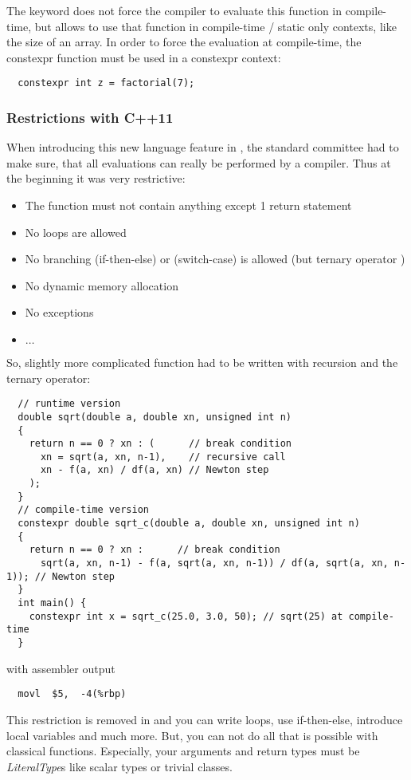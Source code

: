 The keyword  does not force the compiler to evaluate this function in compile-time, but allows to use that function in
compile-time / static only contexts, like the size of an array. In order to force the evaluation at compile-time, the constexpr function
must be used in a constexpr context:
\begin{verbatim}
  constexpr int z = factorial(7);
\end{verbatim}

\subsubsection{Restrictions with C++11}
When introducing this new language feature in , the standard committee had to make sure, that all evaluations can really be performed
by a compiler. Thus at the beginning it was very restrictive:
\begin{itemize}
  \item The function must not contain anything except 1 return statement
  \item No loops are allowed
  \item No branching (if-then-else) or (switch-case) is allowed (but ternary operator )
  \item No dynamic memory allocation
  \item No exceptions
  \item $\ldots$
\end{itemize}

So, slightly more complicated function had to be written with recursion and the ternary operator:
%
\begin{verbatim}
  // runtime version
  double sqrt(double a, double xn, unsigned int n)
  {
    return n == 0 ? xn : (      // break condition
      xn = sqrt(a, xn, n-1),    // recursive call
      xn - f(a, xn) / df(a, xn) // Newton step
    );
  }
  // compile-time version
  constexpr double sqrt_c(double a, double xn, unsigned int n)
  {
    return n == 0 ? xn :      // break condition
      sqrt(a, xn, n-1) - f(a, sqrt(a, xn, n-1)) / df(a, sqrt(a, xn, n-1)); // Newton step
  }
  int main() {
    constexpr int x = sqrt_c(25.0, 3.0, 50); // sqrt(25) at compile-time
  }
\end{verbatim}
%
with assembler output
\begin{verbatim}
  movl  $5,  -4(%rbp)
\end{verbatim}

This restriction is removed in  and you can write loops, use if-then-else, introduce local variables and much more. But, you can not do
all that is possible with classical functions. Especially, your arguments and return types must be \emph{LiteralType}s like scalar types or
trivial classes.


